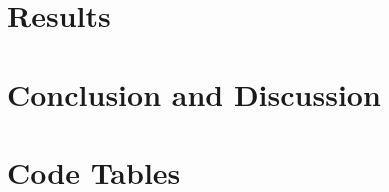 \documentclass[11pt,leqno]{report}
\begin{document}
\chapter{Results}


\chapter{Conclusion and Discussion}


\chapter{Code Tables}



%





\appendix
\end{document}
